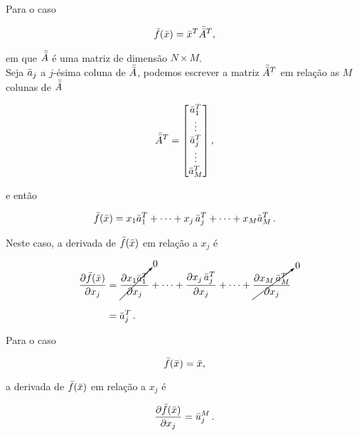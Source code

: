 \begin{example}
    Para o caso

    \begin{equation}
    \bar{f}(\bar{x}) = \bar{x}^T\bar{\bar{A}}^T  ,
    \end{equation}

    \noindent em que $\bar{\bar{A}}$ é uma matriz de dimensão $N \times M$.
    \\
    \indent
    Seja $\bar{a}_j$ a $j$-ésima coluna de $\bar{\bar{A}}$, podemos escrever a matriz
    $\bar{\bar{A}}^T$ em relação as $M$ colunas de $\bar{\bar{A}}$

    \begin{equation}
    \bar{\bar{A}}^T =
        \begin{bmatrix}
        \bar{a}_1^T \\ \vdots \\ \bar{a}_j^T \\ \vdots \\ \bar{a}_M^T
        \end{bmatrix} ,
    \end{equation}

    \noindent e então

    \begin{equation}
    \bar{f}(\bar{x}) = x_1\bar{a}_1^T + \dotsb + x_j\thinspace\bar{a}_j^T +
    \dotsb + x_M\bar{a}_M^T \thinspace .
    \end{equation}

    \indent Neste caso, a derivada de  $\bar{f}(\bar{x})$ em relação
    a $x_j$ é
    
    \begin{equation}
    \begin{split}
    \dfrac{\partial \bar{f}(\bar{x})}{\partial x_j} &=
        \cancelto{0}{\dfrac{\partial x_1\bar{a}_1^T}{\partial x_j}} + \dotsb +
        \dfrac{\partial x_j\thinspace\bar{a}_j^T}{\partial x_j} + \dotsb +
        \cancelto{0}{\dfrac{\partial x_M\thinspace\bar{a}_M^T}{\partial x_j}}
    \\[0.3cm]
    &=
    \bar{a}_j^T
    \thinspace .
    \end{split}
    \label{eq:deriv_xTAT}
    \end{equation}
\end{example}

\begin{example}
    Para o caso

    \begin{equation}
    \bar{f}(\bar{x}) = \bar{x} ,
    \end{equation}
    
    \noindent a derivada de  $\bar{f}(\bar{x})$ em relação
    a $x_j$ é
    
    \begin{equation}
    \dfrac{\partial \bar{f}(\bar{x})}{\partial x_j} = \bar{u}_j^M
    \thinspace .
    \end{equation}
\end{example}

